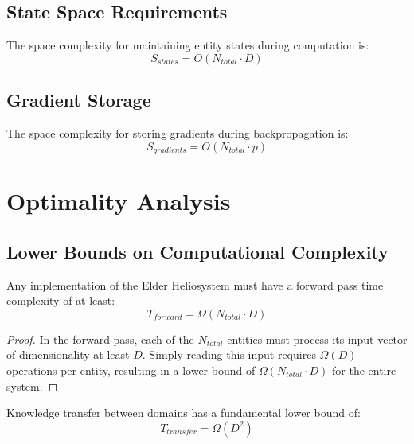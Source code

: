 \subsection{State Space Requirements}

\begin{theorem}
The space complexity for maintaining entity states during computation is:
\begin{equation}
S_{states} = O(N_{total} \cdot D)
\end{equation}
\end{theorem}

\subsection{Gradient Storage}

\begin{theorem}
The space complexity for storing gradients during backpropagation is:
\begin{equation}
S_{gradients} = O(N_{total} \cdot p)
\end{equation}
\end{theorem}

\section{Optimality Analysis}

\subsection{Lower Bounds on Computational Complexity}

\begin{theorem}
Any implementation of the Elder Heliosystem must have a forward pass time complexity of at least:
\begin{equation}
T_{forward} = \Omega(N_{total} \cdot D)
\end{equation}
\end{theorem}

\begin{proof}
In the forward pass, each of the $N_{total}$ entities must process its input vector of dimensionality at least $D$. Simply reading this input requires $\Omega(D)$ operations per entity, resulting in a lower bound of $\Omega(N_{total} \cdot D)$ for the entire system.
\end{proof}

\begin{theorem}
Knowledge transfer between domains has a fundamental lower bound of:
\begin{equation}
T_{transfer} = \Omega(D^2)
\end{equation}
\end{theorem}

